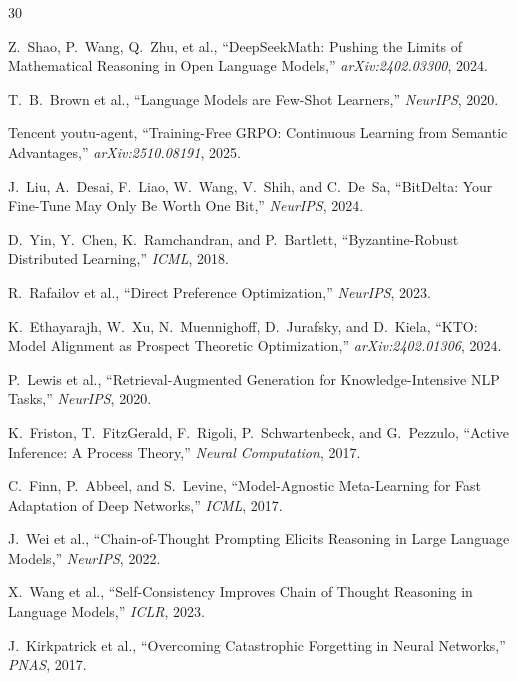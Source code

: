 \documentclass[11pt,letterpaper]{article}
\begin{document}

\begin{thebibliography}{30}

Z.~Shao, P.~Wang, Q.~Zhu, et al., ``DeepSeekMath: Pushing the Limits of Mathematical Reasoning in Open Language Models,'' \textit{arXiv:2402.03300}, 2024.

T.~B.~Brown et al., ``Language Models are Few-Shot Learners,'' \textit{NeurIPS}, 2020.

Tencent youtu-agent, ``Training-Free GRPO: Continuous Learning from Semantic Advantages,'' \textit{arXiv:2510.08191}, 2025.

J.~Liu, A.~Desai, F.~Liao, W.~Wang, V.~Shih, and C.~De~Sa, ``BitDelta: Your Fine-Tune May Only Be Worth One Bit,'' \textit{NeurIPS}, 2024.

D.~Yin, Y.~Chen, K.~Ramchandran, and P.~Bartlett, ``Byzantine-Robust Distributed Learning,'' \textit{ICML}, 2018.

R.~Rafailov et al., ``Direct Preference Optimization,'' \textit{NeurIPS}, 2023.

K.~Ethayarajh, W.~Xu, N.~Muennighoff, D.~Jurafsky, and D.~Kiela, ``KTO: Model Alignment as Prospect Theoretic Optimization,'' \textit{arXiv:2402.01306}, 2024.

P.~Lewis et al., ``Retrieval-Augmented Generation for Knowledge-Intensive NLP Tasks,'' \textit{NeurIPS}, 2020.

K.~Friston, T.~FitzGerald, F.~Rigoli, P.~Schwartenbeck, and G.~Pezzulo, ``Active Inference: A Process Theory,'' \textit{Neural Computation}, 2017.

C.~Finn, P.~Abbeel, and S.~Levine, ``Model-Agnostic Meta-Learning for Fast Adaptation of Deep Networks,'' \textit{ICML}, 2017.

J.~Wei et al., ``Chain-of-Thought Prompting Elicits Reasoning in Large Language Models,'' \textit{NeurIPS}, 2022.

X.~Wang et al., ``Self-Consistency Improves Chain of Thought Reasoning in Language Models,'' \textit{ICLR}, 2023.

J.~Kirkpatrick et al., ``Overcoming Catastrophic Forgetting in Neural Networks,'' \textit{PNAS}, 2017.


\end{thebibliography}
\end{document}

